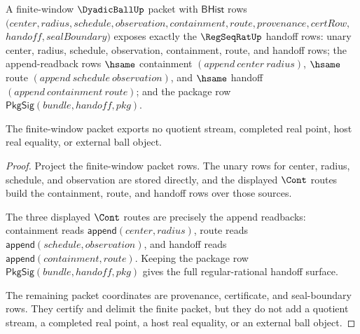 \begin{theorem}
\label{thm:dyadicball-finite-window-packet-regseqrat-handoff}
A finite-window $\DyadicBallUp$ packet with $\mathsf{BHist}$ rows
$(center,radius,schedule,observation,containment,route,provenance,certRow,$
$handoff,sealBoundary)$ exposes exactly the $\RegSeqRatUp$ handoff rows:
unary center, radius, schedule, observation, containment, route, and handoff
rows; the append-readback rows $\hsame$ containment $(append\ center\ radius)$,
$\hsame$ route $(append\ schedule\ observation)$, and $\hsame$ handoff
$(append\ containment\ route)$; and the package row
$\mathsf{PkgSig}(bundle,handoff,pkg)$.

The finite-window packet exports no quotient stream, completed real point,
host real equality, or external ball object.
\end{theorem}
\begin{proof}
Project the finite-window packet rows. The unary rows for center, radius,
schedule, and observation are stored directly, and the displayed $\Cont$
routes build the containment, route, and handoff rows over those sources.

The three displayed $\Cont$ routes are precisely the append readbacks:
containment reads $\mathsf{append}(center,radius)$, route reads
$\mathsf{append}(schedule,observation)$, and handoff reads
$\mathsf{append}(containment,route)$. Keeping the package row
$\mathsf{PkgSig}(bundle,handoff,pkg)$ gives the full regular-rational
handoff surface.

The remaining packet coordinates are provenance, certificate, and
seal-boundary rows. They certify and delimit the finite packet, but they do
not add a quotient stream, a completed real point, a host real equality, or
an external ball object.
\end{proof}

